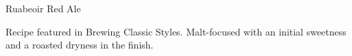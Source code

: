 \begin{recipe}{Ruabeoir Red Ale}

\begin{aboutblock}
Recipe featured in Brewing Classic Styles. Malt-focused with an initial sweetness
and a roasted dryness in the finish. \sourceaha
\end{aboutblock}


\begin{methodandtiming}

\begin{mashsteps}
\end{mashsteps}

\begin{fermentationsteps}
\end{fermentationsteps}

\end{methodandtiming}

\recipebreak

\begin{ingredientsblock}

\begin{malts}
\end{malts}

\begin{hops}
\end{hops}


\end{ingredientsblock}

\end{recipe}


